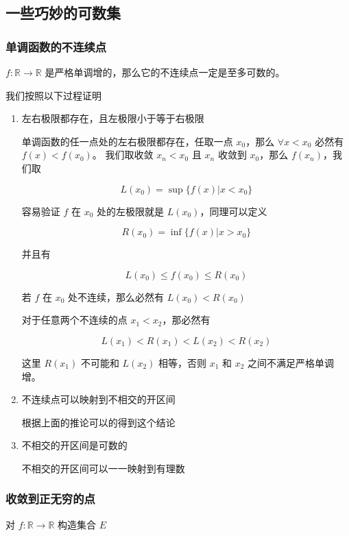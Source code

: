 \documentclass[12pt,a4paper]{ctexart}
\begin{document}
\subsection{一些巧妙的可数集}

\subsubsection{单调函数的不连续点}

$f: \mathbb{R} \to \mathbb{R}$ 是严格单调增的，那么它的不连续点一定是至多可数的。

我们按照以下过程证明

\begin{enumerate}
    \item 左右极限都存在，且左极限小于等于右极限

    单调函数的任一点处的左右极限都存在，任取一点 $x_0$，那么 $\forall x < x_0$ 必然有 $f(x) < f(x_0)$。
    我们取收敛 $x_n < x_0$ 且 $x_n$ 收敛到 $x_0$，那么 $f(x_n)$，我们取

\[
L(x_0) = \sup \{ f(x) \vert x < x_0 \}
\]

容易验证 $f$ 在 $x_0$ 处的左极限就是 $L(x_0)$，同理可以定义 

\[
R(x_0) = \inf \{ f(x) \vert x > x_0 \}
\]

并且有

\[
L(x_0) \le f(x_0) \le R(x_0)
\]

若 $f$ 在 $x_0$ 处不连续，那么必然有 $L(x_0) < R(x_0)$

对于任意两个不连续的点 $x_1 < x_2$，那必然有

\[
L(x_1) < R(x_1) < L(x_2) < R(x_2)
\]

这里 $R(x_1)$ 不可能和 $L(x_2)$ 相等，否则 $x_1$ 和 $x_2$ 之间不满足严格单调增。

\item 不连续点可以映射到不相交的开区间

根据上面的推论可以的得到这个结论

\item 不相交的开区间是可数的

不相交的开区间可以一一映射到有理数

\end{enumerate}

\subsubsection{收敛到正无穷的点}

对 $f: \mathbb{R} \to \mathbb{R}$ 构造集合 $E$
\end{document}
